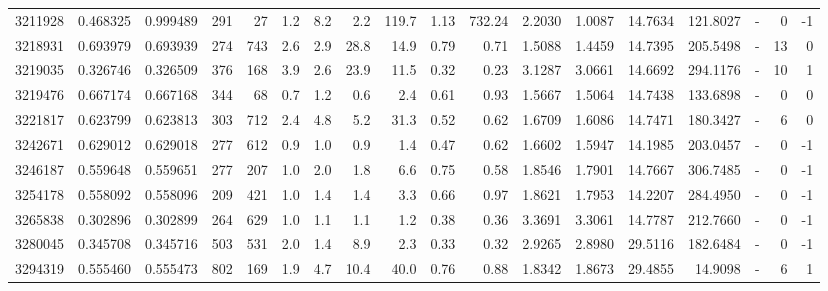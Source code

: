 \begin{tabular}{rrrrrrrrrrrrrrrlrr}
   3211928 & 0.468325 &   0.999489 &  291 &   27 &      1.2 &      8.2 &     2.2 &    119.7 &       1.13 &      732.24 &  2.2030 &  1.0087 &   14.7634 &  121.8027 &             - &        0 &         -1 \\
   3218931 & 0.693979 &   0.693939 &  274 &  743 &      2.6 &      2.9 &    28.8 &     14.9 &       0.79 &        0.71 &  1.5088 &  1.4459 &   14.7395 &  205.5498 &             - &       13 &          0 \\
   3219035 & 0.326746 &   0.326509 &  376 &  168 &      3.9 &      2.6 &    23.9 &     11.5 &       0.32 &        0.23 &  3.1287 &  3.0661 &   14.6692 &  294.1176 &             - &       10 &          1 \\
   3219476 & 0.667174 &   0.667168 &  344 &   68 &      0.7 &      1.2 &     0.6 &      2.4 &       0.61 &        0.93 &  1.5667 &  1.5064 &   14.7438 &  133.6898 &             - &        0 &          0 \\
   3221817 & 0.623799 &   0.623813 &  303 &  712 &      2.4 &      4.8 &     5.2 &     31.3 &       0.52 &        0.62 &  1.6709 &  1.6086 &   14.7471 &  180.3427 &             - &        6 &          0 \\
   3242671 & 0.629012 &   0.629018 &  277 &  612 &      0.9 &      1.0 &     0.9 &      1.4 &       0.47 &        0.62 &  1.6602 &  1.5947 &   14.1985 &  203.0457 &             - &        0 &         -1 \\
   3246187 & 0.559648 &   0.559651 &  277 &  207 &      1.0 &      2.0 &     1.8 &      6.6 &       0.75 &        0.58 &  1.8546 &  1.7901 &   14.7667 &  306.7485 &             - &        0 &         -1 \\
   3254178 & 0.558092 &   0.558096 &  209 &  421 &      1.0 &      1.4 &     1.4 &      3.3 &       0.66 &        0.97 &  1.8621 &  1.7953 &   14.2207 &  284.4950 &             - &        0 &         -1 \\
   3265838 & 0.302896 &   0.302899 &  264 &  629 &      1.0 &      1.1 &     1.1 &      1.2 &       0.38 &        0.36 &  3.3691 &  3.3061 &   14.7787 &  212.7660 &             - &        0 &         -1 \\
   3280045 & 0.345708 &   0.345716 &  503 &  531 &      2.0 &      1.4 &     8.9 &      2.3 &       0.33 &        0.32 &  2.9265 &  2.8980 &   29.5116 &  182.6484 &             - &        0 &         -1 \\
   3294319 & 0.555460 &   0.555473 &  802 &  169 &      1.9 &      4.7 &    10.4 &     40.0 &       0.76 &        0.88 &  1.8342 &  1.8673 &   29.4855 &   14.9098 &             - &        6 &          1 \\

\end{tabular}
